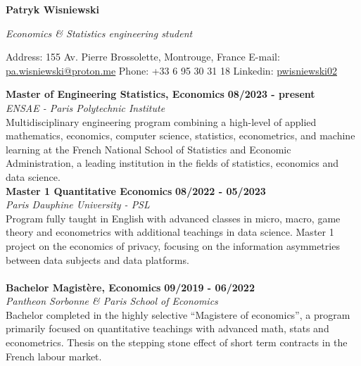 \documentclass[11pt]{report}
\begin{document}
\hspace*{-\parindent}\hspace{-1em}
\begin{center}
\begin{Large}\textbf{Patryk Wisniewski\\}\end{Large}
\emph{Economics \& Statistics engineering student}
\end{center}\vspace{0.1cm}
	 Address: 155 Av. Pierre Brossolette, Montrouge, France \hfill E-mail: \href{mailto:pa.wisniewski@proton.me}{\underline{pa.wisniewski@proton.me}}
	\newline Phone: +33 6 95 30 31 18 \hfill
	 Linkedin: \href{https://linkedin.com/in/pwisniewski02}{\underline{pwisniewski02}}


	\begin{flushleft}
	\raisebox{-.6ex}{HIGHER EDUCATION} \hrulefill
	\end{flushleft}

	
\noindent\textbf{Master of Engineering \textbar\space Statistics,  Economics}
\hfill
\textbf{08/2023 - present} \\
\emph{ENSAE - Paris Polytechnic Institute}\\
Multidisciplinary engineering program combining a high-level of applied mathematics, economics, computer science, statistics, econometrics, and machine learning at the French National School of Statistics and Economic Administration, a leading institution in the fields of statistics, economics and data science.  \\

\noindent\textbf{Master 1 \textbar\space Quantitative Economics}
\hfill
\textbf{08/2022 - 05/2023} \\
\emph{Paris Dauphine University - PSL}\\
Program fully taught in English with advanced classes in micro, macro, game theory and econometrics  with additional teachings in data science. Master 1 project on the economics of privacy, focusing on the information asymmetries between data subjects and data platforms. \\
\\
\noindent\textbf{Bachelor \textbar\space Magistère, Economics}
\hfill
\textbf{09/2019 - 06/2022} \\
\emph{Pantheon Sorbonne \& Paris School of Economics}\\
Bachelor completed in the highly selective “Magistere of economics”, a program primarily focused on quantitative teachings with advanced math, stats and econometrics. Thesis on the stepping stone effect of short term contracts in the French labour market. 
\end{document}
